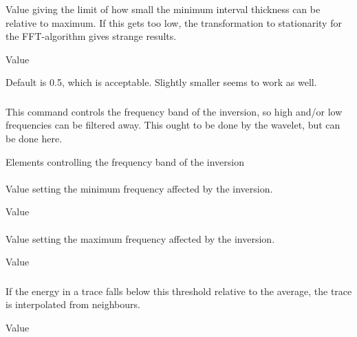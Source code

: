 \subsubsection{}
 \slist
   \item \Description Value giving the limit of how small the minimum interval thickness can be relative to maximum. If this gets too low, the transformation to stationarity for the FFT-algorithm gives strange results.
   \item \Argument Value
   \item \Default Default is 0.5, which is acceptable. Slightly smaller seems to work as well.
 \elist

\subsubsection{}
 \slist
   \item \Description This command controls the frequency band of the inversion, so high and/or low frequencies can be filtered away. This ought to be done by the wavelet, but can be done here.
   \item \Argument Elements controlling the frequency band of the inversion
   \item \Default
 \elist

\paragraph{}
 \slist
   \item \Description Value setting the minimum frequency affected by the inversion.
   \item \Argument Value
   \item {}
 \elist

\paragraph{}
 \slist
   \item \Description Value setting the maximum frequency affected by the inversion.
   \item \Argument Value
   \item {}
 \elist

\subsubsection{}
 \slist
   \item \Description If the energy in a trace falls below this threshold relative to the average, the trace is interpolated from neighbours.
   \item \Argument Value
   \item {}
 \elist

